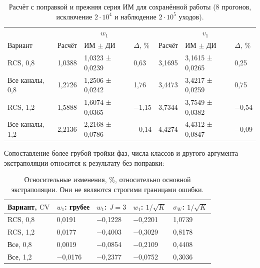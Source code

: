 \documentclass[a4paper,12pt]{article}
\begin{document}
\begin{table}[!htbp]
\centering\small\setlength{\tabcolsep}{2pt}
\begin{tabular}{@{}p{4.16cm}p{1.61cm}p{2.83cm}p{1.28cm}p{1.61cm}p{2.83cm}p{1.28cm}@{}}
\toprule
 & \multicolumn{3}{c}{$w_1$} & \multicolumn{3}{c}{$v_1$} \\
Вариант & Расчёт & ИМ $\pm$ ДИ & $\Delta$, \% & Расчёт & ИМ $\pm$ ДИ & $\Delta$, \% \\
\midrule
RCS, 0,8 & 1,0388 & 1,0323 ± 0,0239 & 0,63 & 3,1695 & 3,1615 ± 0,0265 & 0,25 \\
Все каналы, 0,8 & 1,2726 & 1,2506 ± 0,0242 & 1,76 & 3,4473 & 3,4217 ± 0,0259 & 0,75 \\
RCS, 1,2 & 1,5888 & 1,6074 ± 0,0365 & −1,15 & 3,7344 & 3,7549 ± 0,0382 & −0,54 \\
Все каналы, 1,2 & 2,2136 & 2,2168 ± 0,0786 & −0,14 & 4,4274 & 4,4312 ± 0,0847 & −0,09 \\
\bottomrule
\end{tabular}
\caption{Расчёт с поправкой и прежняя серия ИМ для сохранённой работы (8 прогонов, исключение \(2\cdot10^4\) и наблюдение \(2\cdot10^5\) уходов).}
\label{tab:oldsim}
\end{table}

Сопоставление более грубой тройки фаз, числа классов и другого аргумента экстраполяции относится к результату без поправки:

\begin{table}[!htbp]
\centering\small\setlength{\tabcolsep}{2pt}
\begin{tabular}{@{}p{4.44cm}p{2.79cm}p{2.79cm}p{2.79cm}p{2.79cm}@{}}
\toprule
Вариант, $\mathrm{CV}$ & $w_1$: грубее & $w_1$: $J=3$ & $w_1$: $1/\sqrt K$ & $\sigma_W$: $1/\sqrt K$ \\
\midrule
RCS, 0,8 & 0,0191 & −0,1228 & −0,2201 & 1,0739 \\
RCS, 1,2 & 0,0177 & −0,4003 & −0,3029 & 0,8178 \\
Все, 0,8 & 0,0019 & −0,0854 & −0,2109 & 0,4408 \\
Все, 1,2 & −0,0176 & −0,2377 & −0,0752 & 0,3036 \\
\bottomrule
\end{tabular}
\caption{Относительные изменения, \%, относительно основной экстраполяции. Они не являются строгими границами ошибки.}
\label{tab:sensitivity}
\end{table}
\end{document}
